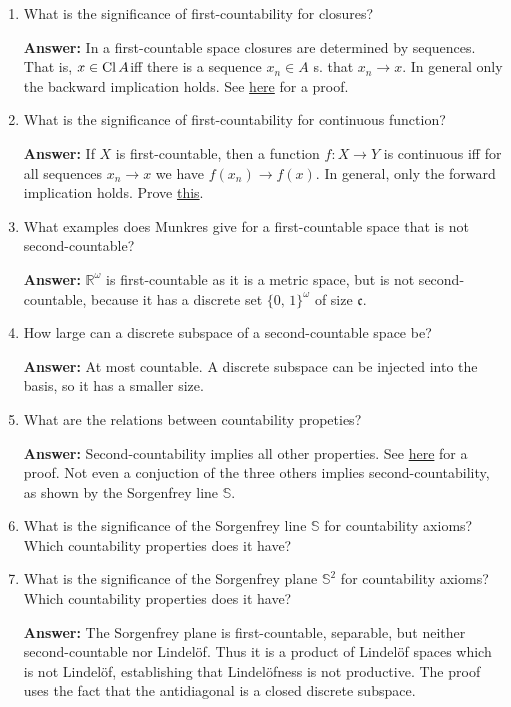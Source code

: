 \begin{enumerate}
    \item What is the significance of first-countability for closures?

    \textbf{Answer:} In a first-countable space closures are determined by sequences. That is, \( x \in \operatorname{Cl} A \)iff there is a sequence \( x_n \in A \) s. that \( x_n \to x \). In general only the backward implication holds. See \hyperlink{FirstCountableClosures}{here} for a proof.

    \item What is the significance of first-countability for continuous function?

    \textbf{Answer:} If \( X \) is first-countable, then a function \( f: X \to Y \) is continuous iff for all sequences \( x_n \to x \) we have \( f(x_n) \to f(x) \). In general, only the forward implication holds. Prove \hyperlink{FirstCountableContinuousFunctions}{this}.
    
    \item What examples does Munkres give for a first-countable space that is not second-countable?

        \textbf{Answer:} \( \mathbb{R}^\omega \) is first-countable as it is a metric space, but is not second-countable, because it has a discrete set \( \{ 0,\,1 \}^\omega \) of size \( \mathfrak{c} \).
    \item How large can a discrete subspace of a second-countable space be?
    
    \textbf{Answer:} At most countable. A discrete subspace can be injected into the basis, so it has a smaller size.
    \item What are the relations between countability propeties?

    \textbf{Answer:} Second-countability implies all other properties. See \hyperlink{MetrisableSpaceCountabilityProperties}{here} for a proof. Not even a conjuction of the three others implies second-countability, as shown by the Sorgenfrey line \( \mathbb{S} \).
    \item What is the significance of the Sorgenfrey line \( \mathbb{S} \) for countability axioms? Which countability properties does it have?
    \item What is the significance of the Sorgenfrey plane \( \mathbb{S}^2 \) for countability axioms? Which countability properties does it have?

        \textbf{Answer:}  The Sorgenfrey plane is first-countable, separable, but neither second-countable nor Lindel\"of. Thus it is a product of Lindel\"of spaces which is not Lindel\"of, establishing that Lindel\"ofness is not productive. The proof uses the fact that the antidiagonal is a closed discrete subspace.


\end{enumerate}
